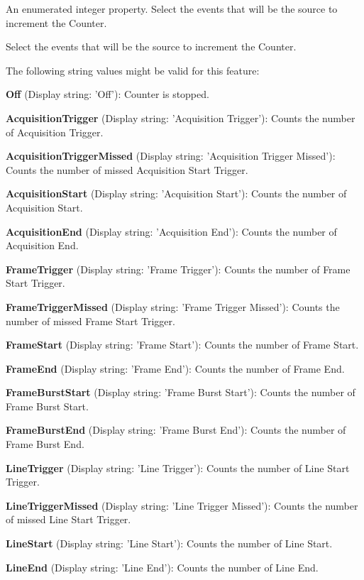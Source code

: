 An enumerated integer property. Select the events that will be the source to increment the Counter. 

Select the events that will be the source to increment the Counter.

The following string values might be valid for this feature\+:
\begin{DoxyItemize}
\item {\bfseries Off} (Display string\+: 'Off')\+: Counter is stopped.
\item {\bfseries Acquisition\+Trigger} (Display string\+: 'Acquisition Trigger')\+: Counts the number of Acquisition Trigger.
\item {\bfseries Acquisition\+Trigger\+Missed} (Display string\+: 'Acquisition Trigger Missed')\+: Counts the number of missed Acquisition Start Trigger.
\item {\bfseries Acquisition\+Start} (Display string\+: 'Acquisition Start')\+: Counts the number of Acquisition Start.
\item {\bfseries Acquisition\+End} (Display string\+: 'Acquisition End')\+: Counts the number of Acquisition End.
\item {\bfseries Frame\+Trigger} (Display string\+: 'Frame Trigger')\+: Counts the number of Frame Start Trigger.
\item {\bfseries Frame\+Trigger\+Missed} (Display string\+: 'Frame Trigger Missed')\+: Counts the number of missed Frame Start Trigger.
\item {\bfseries Frame\+Start} (Display string\+: 'Frame Start')\+: Counts the number of Frame Start.
\item {\bfseries Frame\+End} (Display string\+: 'Frame End')\+: Counts the number of Frame End.
\item {\bfseries Frame\+Burst\+Start} (Display string\+: 'Frame Burst Start')\+: Counts the number of Frame Burst Start.
\item {\bfseries Frame\+Burst\+End} (Display string\+: 'Frame Burst End')\+: Counts the number of Frame Burst End.
\item {\bfseries Line\+Trigger} (Display string\+: 'Line Trigger')\+: Counts the number of Line Start Trigger.
\item {\bfseries Line\+Trigger\+Missed} (Display string\+: 'Line Trigger Missed')\+: Counts the number of missed Line Start Trigger.
\item {\bfseries Line\+Start} (Display string\+: 'Line Start')\+: Counts the number of Line Start.
\item {\bfseries Line\+End} (Display string\+: 'Line End')\+: Counts the number of Line End.

\end{DoxyItemize}
